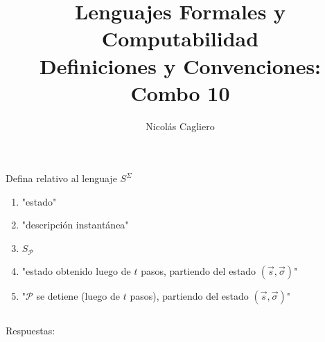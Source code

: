 \documentclass{article}
\title{Lenguajes Formales y Computabilidad \\
        \large Definiciones y Convenciones: Combo 10 }
\author{Nicolás Cagliero}
\begin{document}
\maketitle

Defina relativo al lenguaje $S^{\Sigma}$
\begin{enumerate}
    \item "estado"

    \item "descripción instantánea"
    
    \item $S_{\mathcal{P}}$
    
    \item "estado obtenido luego de $t$ pasos, partiendo del estado 
    $(\overset{\rightarrow}{s}, \overset{\rightarrow}{\sigma})$"
    
    \item "$\mathcal{P}$ se detiene (luego de $t$ pasos), partiendo del estado
    $(\overset{\rightarrow}{s}, \overset{\rightarrow}{\sigma})$"
\end{enumerate}

\(\)
\begin{center}
    Respuestas: 
    \(\)
\end{center}
\end{document}
